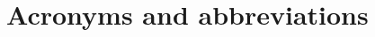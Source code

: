 \section{Acronyms and abbreviations}
\label{sec:Acronyms and abbreviations}
\begin{acronym}
\setlength{\itemsep}{-\parsep}
\end{acronym}
